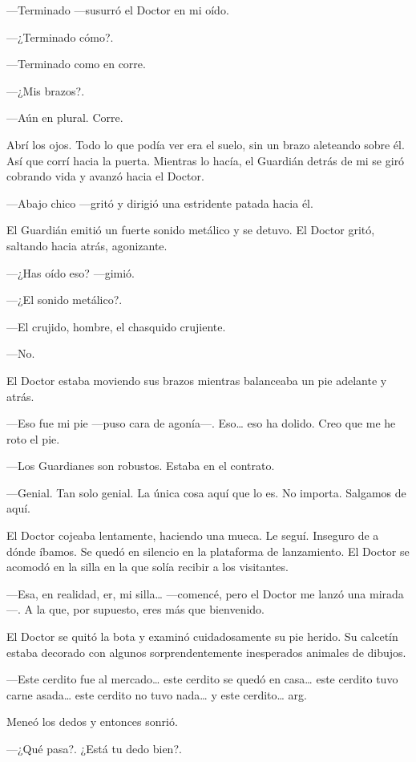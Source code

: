 ---Terminado ---susurró el Doctor en mi oído.

---¿Terminado cómo?.

---Terminado como en corre.

---¿Mis brazos?.

---Aún en plural. Corre.

Abrí los ojos. Todo lo que podía ver era el suelo, sin un brazo
aleteando sobre él. Así que corrí hacia la puerta. Mientras lo hacía, el
Guardián detrás de mi se giró cobrando vida y avanzó hacia el Doctor.

---Abajo chico ---gritó y dirigió una estridente patada hacia él.

El Guardián emitió un fuerte sonido metálico y se detuvo. El Doctor
gritó, saltando hacia atrás, agonizante.

---¿Has oído eso? ---gimió.

---¿El sonido metálico?.

---El crujido, hombre, el chasquido crujiente.

---No.

El Doctor estaba moviendo sus brazos mientras balanceaba un pie adelante
y atrás.

---Eso fue mi pie ---puso cara de agonía---. Eso\ldots{} eso ha dolido.
Creo que me he roto el pie.

---Los Guardianes son robustos. Estaba en el contrato.

---Genial. Tan solo genial. La única cosa aquí que lo es. No importa.
Salgamos de aquí.

El Doctor cojeaba lentamente, haciendo una mueca. Le seguí. Inseguro de
a dónde íbamos. Se quedó en silencio en la plataforma de lanzamiento. El
Doctor se acomodó en la silla en la que solía recibir a los visitantes.

---Esa, en realidad, er, mi silla\ldots{} ---comencé, pero el Doctor me
lanzó una mirada---. A la que, por supuesto, eres más que bienvenido.

El Doctor se quitó la bota y examinó cuidadosamente su pie herido. Su
calcetín estaba decorado con algunos sorprendentemente inesperados
animales de dibujos.

---Este cerdito fue al mercado\ldots{} este cerdito se quedó en
casa\ldots{} este cerdito tuvo carne asada\ldots{} este cerdito no tuvo
nada\ldots{} y este cerdito\ldots{} arg.

Meneó los dedos y entonces sonrió.

---¿Qué pasa?. ¿Está tu dedo bien?.

